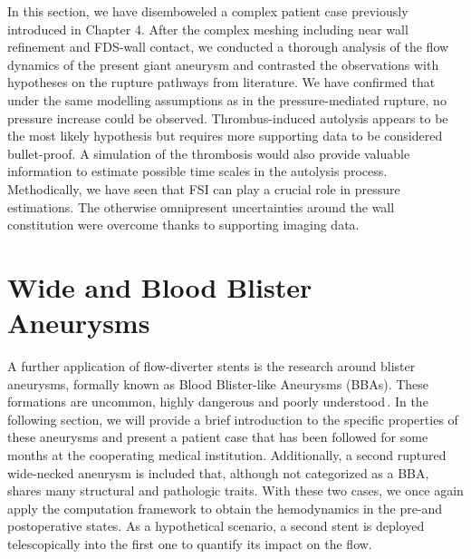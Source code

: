 \vspace*{1cm}

\begin{tcolorbox}[conclusions]

	In this section, we have disemboweled a complex patient case previously introduced in Chapter 4. After the complex meshing including near wall refinement and FDS-wall contact, we conducted a thorough analysis of the flow dynamics of the present giant aneurysm and contrasted the observations with hypotheses on the rupture pathways from literature. We have confirmed that under the same modelling assumptions as in the pressure-mediated rupture, no pressure increase could be observed. Thrombus-induced autolysis appears to be the most likely hypothesis but requires more supporting data to be considered bullet-proof. A simulation of the thrombosis would also provide valuable information to estimate possible time scales in the autolysis process. Methodically, we have seen that FSI can play a crucial role in pressure estimations. The otherwise omnipresent uncertainties around the wall constitution were overcome thanks to supporting imaging data.
\end{tcolorbox}

\newpage

\section{Wide and Blood Blister Aneurysms}
A further application of flow-diverter stents is the research around blister aneurysms, formally known as Blood Blister-like Aneurysms (BBAs). These formations are uncommon, highly dangerous and poorly understood\,\cite{Meling2017, Peschillo2016}. In the following section, we will provide a brief introduction to the specific properties of these aneurysms and present a patient case that has been followed for some months at the cooperating medical institution. Additionally, a second ruptured wide-necked aneurysm is included that, although not categorized as a BBA, shares many structural and pathologic traits. With these two cases, we once again apply the computation framework to obtain the hemodynamics in the pre-and postoperative states. As a hypothetical scenario, a second stent is deployed telescopically into the first one to quantify its impact on the flow.


